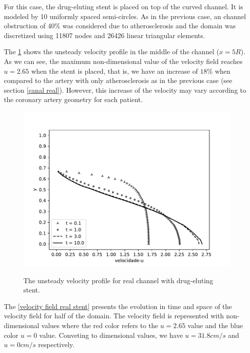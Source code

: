 For this case, the drug-eluting stent is placed on top of 
the curved channel. It is modeled by 10 uniformly spaced 
semi-circles. As in the previous case, an channel obstruction of 
40\% was considered due to atherosclerosis and the domain was 
discretized using 11807 nodes and 26426 linear triangular elements. 

\par 
The \ref{velocity evolution real stent} shows the unsteady velocity 
profile in the middle of the channel ($x=5R$). 
As we can see, the maximum non-dimensional value of the velocity field 
reaches $u=2.65$ when the stent is placed, that is, we have an 
increase of $18$\% when compared to the artery with only 
atherosclerosis as in the previous case 
(see section \ref{canal real}).
However, this increase of the velocity may vary according to the 
coronary artery geometry for each patient.

\begin{figure}[H]
     \centering
     \includegraphics[scale=1]{./02_chaps/cap_solution/figure/vel_RealStrut_evol.pdf}\\
     \caption{
The unsteady velocity profile for real channel with drug-eluting stent.}
     \label{velocity evolution real stent}
\end{figure}

\newpage
The \ref{velocity field real stent} presents the evolution in 
time and space of the velocity field for half of the domain. 
The velocity field is represented with non-dimensional values 
where the red color refers to the $u=2.65$ value and the blue color 
$u=0$ value. Conveting to dimensional values, 
we have $u=31.8cm/s$ and $u=0cm/s$ respectively.

